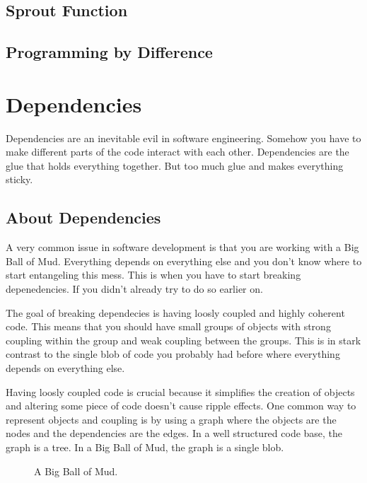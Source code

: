 \section{Sprout Function}

\section{Programming by Difference}

\chapter{Dependencies}

Dependencies are an inevitable evil in software engineering. Somehow you have to make different parts of the code interact with each other. Dependencies are the glue that holds everything together. But too much glue and makes everything sticky.

\section{About Dependencies}

A very common issue in software development is that you are working with a Big Ball of Mud. Everything depends on everything else and you don't know where to start entangeling this mess. This is when you have to start breaking depenedencies. If you didn't already try to do so earlier on.

The goal of breaking dependecies is having loosly coupled and highly coherent code. This means that you should have small groups of objects with strong coupling within the group and weak coupling between the groups. This is in stark contrast to the single blob of code you probably had before where everything depends on everything else.

Having loosly coupled code is crucial because it simplifies the creation of objects and altering some piece of code doesn't cause ripple effects. One common way to represent objects and coupling is by using a graph where the objects are the nodes and the dependencies are the edges. In a well structured code base, the graph is a tree. In a Big Ball of Mud, the graph is a single blob.


\begin{figure}[h]
    \centering
    \caption{A Big Ball of Mud.}
    \label{fig:big_ball_of_mud}
\end{figure}

